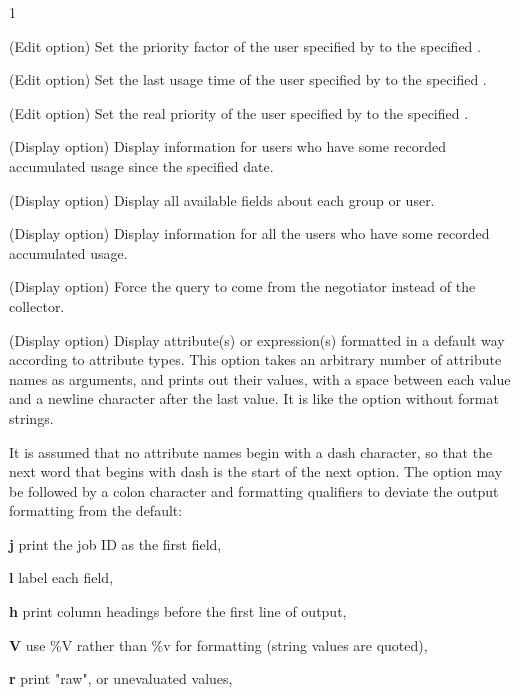 \begin{ManPage}{\label{man-condor-userprio}}{1}
\begin{Options}
  {(Edit option) Set the priority factor of the user specified by
   to the specified .  }

  {(Edit option) Set the last usage time of the user specified by
   to the specified .  }

  {(Edit option) Set the real priority of the user specified by
   to the specified .  }

  {(Display option) Display information for users who have 
  some recorded accumulated usage since the specified date.  }

  {(Display option) Display all available fields about each group or user.}

  {(Display option) Display information for all the users 
  who have some recorded accumulated usage.}

  {(Display option) Force the query to come from the negotiator
   instead of the collector.}

   {
    (Display option) Display attribute(s) or expression(s)
    formatted in a default way according to attribute types.  
    This option takes an arbitrary number of attribute names as arguments,
    and prints out their values, 
    with a space between each value and a newline character after 
    the last value.  
    It is like the  option without format strings.

    It is assumed that no attribute names begin with a dash character,
    so that the next word that begins with dash is the 
    start of the next option.
    The  option may be followed by a colon character
    and formatting qualifiers to deviate the output formatting from
    the default:

    \textbf{j} print the job ID as the first field,

    \textbf{l} label each field,

    \textbf{h} print column headings before the first line of output,

    \textbf{V} use \%V rather than \%v for formatting (string values
    are quoted),

    \textbf{r} print "raw", or unevaluated values,

}
\end{Options}
\end{ManPage}
